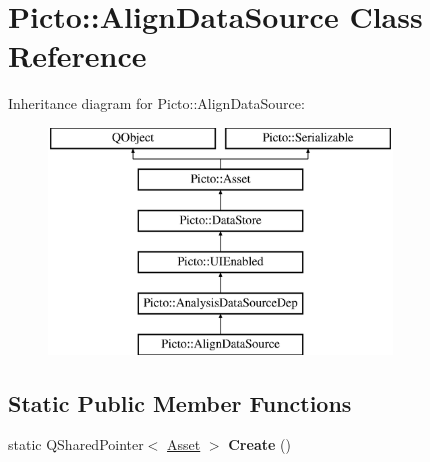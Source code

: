 \hypertarget{class_picto_1_1_align_data_source}{\section{Picto\-:\-:Align\-Data\-Source Class Reference}
\label{class_picto_1_1_align_data_source}
}
Inheritance diagram for Picto\-:\-:Align\-Data\-Source\-:\begin{figure}[H]
\begin{center}
\leavevmode
\includegraphics[height=6.000000cm]{class_picto_1_1_align_data_source}
\end{center}
\end{figure}
\subsection*{Static Public Member Functions}
\begin{DoxyCompactItemize}
\item 
\hypertarget{class_picto_1_1_align_data_source_a1c17afbbb7d618f6cbae3cf4dd1276aa}{static Q\-Shared\-Pointer$<$ \hyperlink{class_picto_1_1_asset}{Asset} $>$ {\bfseries Create} ()}\label{class_picto_1_1_align_data_source_a1c17afbbb7d618f6cbae3cf4dd1276aa}

\end{DoxyCompactItemize}
